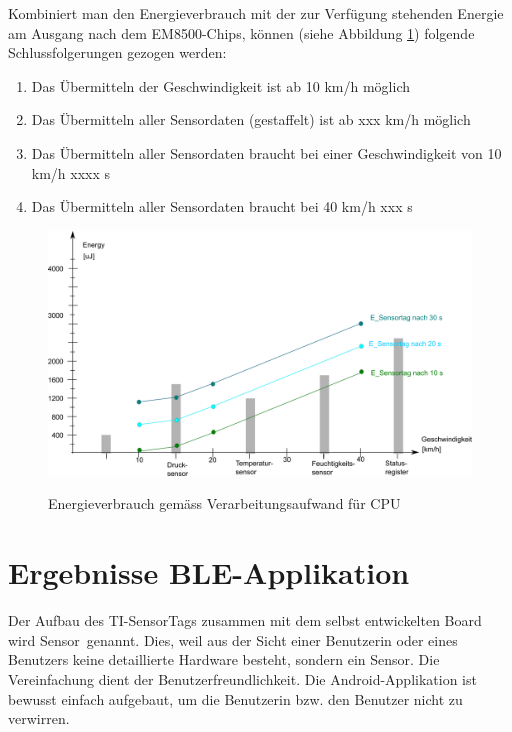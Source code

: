 Kombiniert man den Energieverbrauch mit der zur Verfügung stehenden Energie am Ausgang nach dem EM8500-Chips, können (siehe Abbildung \ref{resultat_Zsm_Energy}) folgende Schlussfolgerungen gezogen werden:

\begin{enumerate}
    \item Das Übermitteln der Geschwindigkeit ist ab 10 km/h möglich
    \item Das Übermitteln aller Sensordaten (gestaffelt) ist ab xxx km/h möglich
    \item Das Übermitteln aller Sensordaten braucht bei einer Geschwindigkeit von 10 km/h xxxx s
    \item Das Übermitteln aller Sensordaten braucht bei 40 km/h xxx s
\end{enumerate}

\begin{figure}[ht]
\includegraphics[width=1\textwidth]{4Resultate/imag/EnergyVerbrauchZusammenfassung.png}\label{resultat_Zsm_Energy} 
\caption{Energieverbrauch gem\"{a}ss Verarbeitungsaufwand für CPU}
\end{figure}






\newpage
\section{Ergebnisse BLE-Applikation}

Der Aufbau des TI-SensorTags zusammen mit dem selbst entwickelten Board wird \glqq Sensor\grqq\thinspace\ genannt. Dies, weil aus der Sicht einer Benutzerin oder eines Benutzers keine detaillierte Hardware besteht, sondern \glqq ein Sensor\grqq. Die Vereinfachung dient der Benutzerfreundlichkeit. Die Android-Applikation ist bewusst einfach aufgebaut, um die Benutzerin bzw. den Benutzer nicht zu verwirren. 

